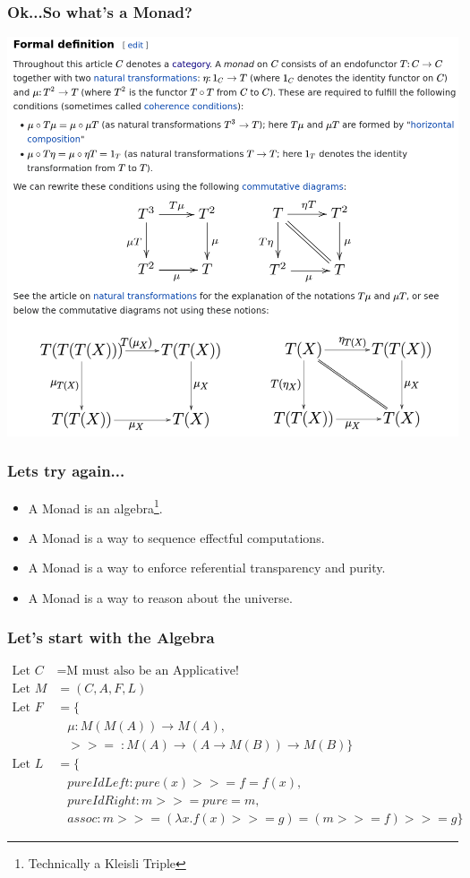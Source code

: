 \documentclass[hyperref={colorlinks = true,linkcolor = blue, citecolor = blue, urlcolor = blue}]{beamer}
\begin{document}
\begin{frame}[fragile]
  \frametitle{Ok...So what's a Monad?}
     \includegraphics[width=\textwidth, height=\textheight]{MonadFormalDef.png}
\end{frame}

\begin{frame}[fragile]
  \frametitle{Lets try again...}
    \begin{itemize}
      \item A Monad is an algebra\footnote{Technically a Kleisli Triple}.
      \item A Monad is a way to sequence effectful computations.
      \item A Monad is a way to enforce referential transparency and purity.
      \item A Monad is a way to reason about the universe.
    \end{itemize}
\end{frame}

\begin{frame}[fragile]
  \frametitle{Let's start with the Algebra}
  \begin{align*}
    \text{Let } C &= \text{M must also be an Applicative!} \\
    \text{Let } M &= (C, A, F, L) \\
    \text{Let } F &= \{ \\
          &\;\;\; \mu : M(M(A)) \to M(A), \\
          &\;\;\; >>= \;: M(A) \to (A \to M(B)) \to M(B) \} \\
    \text{Let } L &= \{ \\
                  &\;\;\;pureIdLeft : pure(x) >>= f = f(x), \\
                  &\;\;\;pureIdRight : m >>= pure = m, \\
                  &\;\;\;assoc : m >>= (\lambda x.f(x) >>= g) = (m >>= f) >>= g \}
  \end{align*}
\end{frame}
\end{document}

